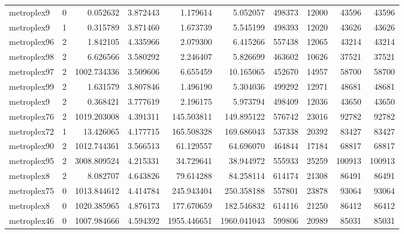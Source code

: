 \documentclass[../../../thesis.tex]{subfiles}
\begin{document}
\begin{longtable}{|l|r|r|r|r|r|r|r|r|r|}
metroplex9 & 0 & 0.052632 & 3.872443 & 1.179614 & 5.052057 & 498373 & 12000 & 43596 & 43596 \\
metroplex9 & 1 & 0.315789 & 3.871460 & 1.673739 & 5.545199 & 498393 & 12020 & 43626 & 43626 \\
metroplex96 & 2 & 1.842105 & 4.335966 & 2.079300 & 6.415266 & 557438 & 12065 & 43214 & 43214 \\
metroplex98 & 2 & 6.626566 & 3.580292 & 2.246407 & 5.826699 & 463602 & 10626 & 37521 & 37521 \\
metroplex97 & 2 & 1002.734336 & 3.509606 & 6.655459 & 10.165065 & 452670 & 14957 & 58700 & 58700 \\
metroplex99 & 2 & 1.631579 & 3.807846 & 1.496190 & 5.304036 & 499292 & 12971 & 48681 & 48681 \\
metroplex9 & 2 & 0.368421 & 3.777619 & 2.196175 & 5.973794 & 498409 & 12036 & 43650 & 43650 \\
metroplex76 & 2 & 1019.203008 & 4.391311 & 145.503811 & 149.895122 & 576742 & 23016 & 92782 & 92782 \\
metroplex72 & 1 & 13.426065 & 4.177715 & 165.508328 & 169.686043 & 537338 & 20392 & 83427 & 83427 \\
metroplex90 & 2 & 1012.744361 & 3.566513 & 61.129557 & 64.696070 & 464844 & 17184 & 68817 & 68817 \\
metroplex95 & 2 & 3008.809524 & 4.215331 & 34.729641 & 38.944972 & 555933 & 25259 & 100913 & 100913 \\
metroplex8 & 2 & 8.082707 & 4.643826 & 79.614288 & 84.258114 & 614174 & 21308 & 86491 & 86491 \\
metroplex75 & 0 & 1013.844612 & 4.414784 & 245.943404 & 250.358188 & 557801 & 23878 & 93064 & 93064 \\
metroplex8 & 0 & 1020.385965 & 4.876173 & 177.670659 & 182.546832 & 614116 & 21250 & 86412 & 86412 \\
metroplex46 & 0 & 1007.984666 & 4.594392 & 1955.446651 & 1960.041043 & 599806 & 20989 & 85031 & 85031 \\
\end{longtable}
\end{document}
